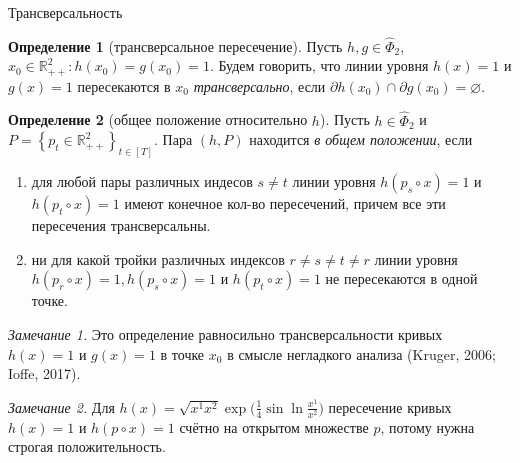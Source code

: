 \documentclass[10pt,aspectratio=169]{beamer}
\theoremstyle{plain}
\theoremstyle{definition}
\newtheorem{defn}{Определение}
\newcommand{\R}{\mathbb{R}}
\newcommand{\set}[1]{\left\{ #1 \right\}}
\newcommand{\Rpp}[1][2]{\R^{#1}_{++}}
\newcommand{\PhiHat}{\hat{\Phi}}
\begin{document}
\begin{frame}{Трансверсальность}
    \begin{defn}[трансверсальное пересечение]\label{def:transversal}
        Пусть $h,g\in\PhiHat_2$, $x_0\in\Rpp: h(x_0)=g(x_0)=1$. Будем говорить, что линии уровня $h(x)=1$ и $g(x)=1$ пересекаются в $x_0$ \emph{трансверсально}, если $\partial h(x_0)\cap\partial g(x_0)=\varnothing$.
    \end{defn}

    \begin{defn}[общее положение относительно $h$]\label{def:gp}
        Пусть $h\in\PhiHat_2$ и $P=\set{p_t\in\Rpp}_{t\in[T]}$. Пара $(h,P)$ находится \emph{в общем положении}, если
        \begin{enumerate}
            \item для любой пары различных индесов $s\neq t$ линии уровня $h(p_{s}\circ x)=1$ и $h(p_{t}\circ x)=1$ имеют конечное кол-во пересечений, причем все эти пересечения трансверсальны.
            \item ни для какой тройки различных индексов $r\neq s\neq t\neq r$ линии уровня
            \\ $h(p_{r}\circ x)=1, h(p_{s}\circ x)=1$ и $h(p_{t}\circ x)=1$ не пересекаются в одной точке.
        \end{enumerate}
    \end{defn}

    \emph{Замечание 1.} Это определение равносильно трансверсальности кривых $h(x)=1$ и $g(x)=1$ в точке $x_0$ в смысле негладкого анализа (Kruger, 2006; Ioffe, 2017).

    \emph{Замечание 2.} Для $h(x)=\sqrt{x^1x^2}\exp\bigl(\tfrac14\sin\ln\tfrac{x^1}{x^2}\bigr)$ пересечение кривых $h(x)=1$ и $h(p\circ x)=1$ счётно на открытом множестве $p$, потому нужна строгая \mbox{положительность}.
\end{frame}
\end{document}

